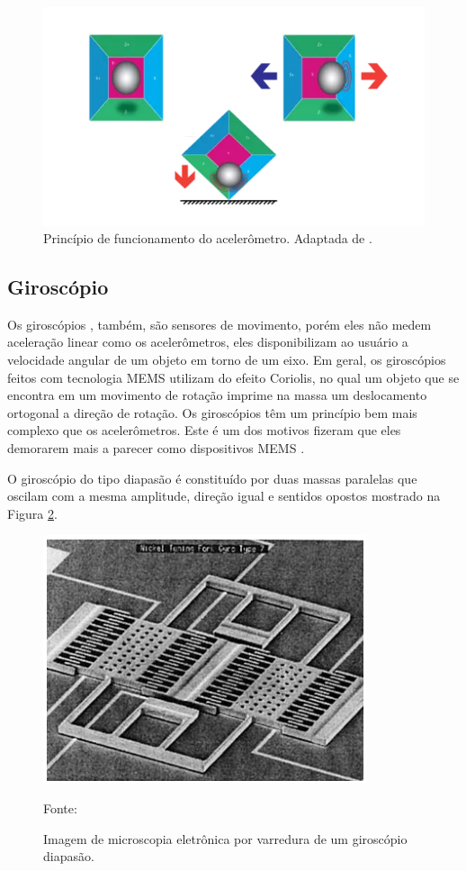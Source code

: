 				\begin{figure}[h!]
					\centering
					\includegraphics[keepaspectratio=true,scale=0.8
					]{figuras/acelerometro.PNG}
					\caption{Princípio de funcionamento do acelerômetro. Adaptada de .}
					
					\label{acel}
				\end{figure}
	
		\subsection{Giroscópio}
			
			Os giroscópios , também, são sensores de movimento, porém eles não medem aceleração linear como os acelerômetros, eles disponibilizam ao usuário a velocidade angular de um objeto em torno de um eixo. Em geral, os giroscópios feitos com tecnologia MEMS utilizam do efeito Coriolis, no qual um objeto que se encontra em um movimento de rotação imprime na massa um deslocamento ortogonal a direção de rotação. Os giroscópios têm um princípio bem mais complexo que os acelerômetros. Este é um dos motivos fizeram que eles demorarem mais a parecer como dispositivos MEMS \cite{almeida2014}.
			
			O giroscópio do tipo diapasão é constituído por duas massas paralelas que oscilam com a mesma amplitude, direção igual e sentidos opostos mostrado na Figura \ref{gyro}.
			
			\begin{figure}[h!]
				\centering
				\includegraphics[keepaspectratio=true,scale=0.7
				]{figuras/diapasao.png}
				\caption{ Imagem de microscopia eletrônica por varredura de um giroscópio diapasão.}
				Fonte: \cite{forhan2010}
				\label{gyro}	
			\end{figure}
			
